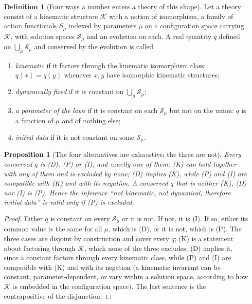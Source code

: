 \documentclass[11pt]{article}
\newtheorem{proposition}[theorem]{Proposition}
\theoremstyle{definition}
\newtheorem{definition}[theorem]{Definition}
\theoremstyle{plain}
\newcommand{\changedmark}[2]{\marginpar{\raggedright\scriptsize\color{#1}#2}}
\begin{document}
\begin{definition}[Four ways a number enters a theory of this shape]\label{c:obj.dark-energy.four-ways-number-enters-theory-shape}
Let a theory consist of a kinematic structure $\mathcal{K}$ with a notion of isomorphism, a family of action functionals $S_\mu$ indexed by parameters $\mu$ on a configuration space carrying $\mathcal{K}$, with solution spaces $\mathcal{S}_\mu$ and an evolution on each. A real quantity $q$ defined on $\bigcup_\mu \mathcal{S}_\mu$ and conserved by the evolution is called
\begin{enumerate}
\item[(K)] \emph{kinematic} if it factors through the kinematic isomorphism class: $q(x) = q(y)$ whenever $x, y$ have isomorphic kinematic structures;
\item[(D)] \emph{dynamically fixed} if it is constant on $\bigcup_\mu \mathcal{S}_\mu$;
\item[(P)] \emph{a parameter of the laws} if it is constant on each $\mathcal{S}_\mu$ but not on the union: $q$ is a function of $\mu$ and of nothing else;
\item[(I)] \emph{initial data} if it is not constant on some $\mathcal{S}_\mu$.
\end{enumerate}
\end{definition}

\begin{proposition}[The four alternatives are exhaustive; the three are not]\label{c:dark-energy.four-alternatives-are-exhaustive-three-are}
\changedmark{BrickRed}{corrected since the deposit}
Every conserved $q$ is (D), (P) or (I), and exactly one of them; (K) can hold together with any of them and is excluded by none; (D) implies (K), while (P) and (I) are compatible with (K) and with its negation. A conserved $q$ that is neither (K), (D) nor (I) is (P). Hence the inference ``not kinematic, not dynamical, therefore initial data'' is valid only if (P) is excluded.
\end{proposition}
\begin{proof}
Either $q$ is constant on every $\mathcal{S}_\mu$ or it is not. If not, it is (I). If so, either its common value is the same for all $\mu$, which is (D), or it is not, which is (P). The three cases are disjoint by construction and cover every $q$; (K) is a statement about factoring through $\mathcal{K}$, which none of the three excludes; (D) implies it, since a constant factors through every kinematic class, while (P) and (I) are compatible with (K) and with its negation (a kinematic invariant can be constant, parameter-dependent, or vary within a solution space, according to how $\mathcal{K}$ is embedded in the configuration space). The last sentence is the contrapositive of the disjunction.

\end{proof}
\end{document}
